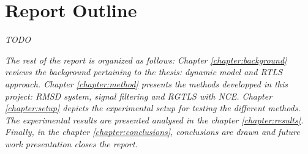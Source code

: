 \documentclass[/home/francois/latex/report/main.tex]{subfiles}
\begin{document}
\section{Report Outline}

\textit{TODO}

{\it
The rest of the report is organized as follows: Chapter \ref{chapter:background} reviews the background pertaining to the thesis: dynamic model and \ac{RTLS} approach. Chapter \ref{chapter:method} presents the methods developped in this project: \ac{RMSD} system, signal filtering and \ac{RGTLS} with \ac{NCE}. Chapter \ref{chapter:setup} depicts the experimental setup for testing the different methods. The experimental results are presented analysed in the chapter \ref{chapter:results}. Finally, in the chapter \ref{chapter:conclusions}, conclusions are drawn and future work presentation closes the report.
}
\end{document}
